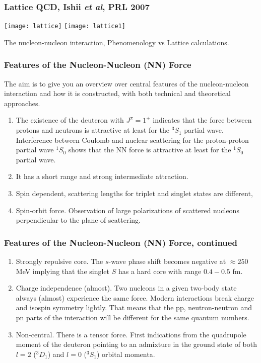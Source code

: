 \documentclass[compress]{beamer}
\begin{document}
\frame
{
  \frametitle{Lattice QCD, Ishii {\em et al}, PRL 2007}
\vspace{-2.0cm}
\begin{center}
  \texttt{[image: lattice]}
  \texttt{[image: lattice1]}\\[1ex]
\end{center}
The nucleon-nucleon interaction, Phenomenology vs Lattice calculations.
}





\frame
{
\frametitle{Features of the Nucleon-Nucleon (NN) Force}
The aim is to give you an overview over central features of the nucleon-nucleon interaction and how
it is constructed, with both technical and theoretical approaches. 
\begin{enumerate}
\item The existence of the deuteron with $J^{\pi}=1^+$ indicates that the force between protons and neutrons is attractive
at least for the $^3S_1$ partial wave. Interference between Coulomb and nuclear scattering for the proton-proton
partial wave $^1S_0$ shows that  the NN force is attractive at least for the $^1S_0$ partial wave. 
\item It has a short range and strong intermediate attraction.
\item Spin dependent, scattering lengths for triplet and singlet states are different,
\item Spin-orbit force. Observation of large polarizations of scattered nucleons perpendicular to the plane of scattering.
\end{enumerate}
} 
\frame
{
\frametitle{Features of the Nucleon-Nucleon (NN) Force, continued}
\begin{enumerate}
\item Strongly repulsive core. The $s$-wave phase shift becomes negative at $\approx 250$ MeV implying that the singlet $S$
has a hard core with range $0.4-0.5$ fm. 
\item Charge independence (almost). Two nucleons in a given two-body state always (almost) experience the same
force. Modern interactions break charge and isospin symmetry lightly. That means that the pp, neutron-neutron and pn 
parts of the 
interaction will be different for the same quantum numbers. 
\item Non-central. There is a tensor force. First indications from the quadrupole moment of the deuteron pointing to an
admixture in the ground state of both $l=2$ ($^3D_1$) and $l=0$ ($^3S_1$) orbital momenta.
\end{enumerate}
} 
\end{document}

